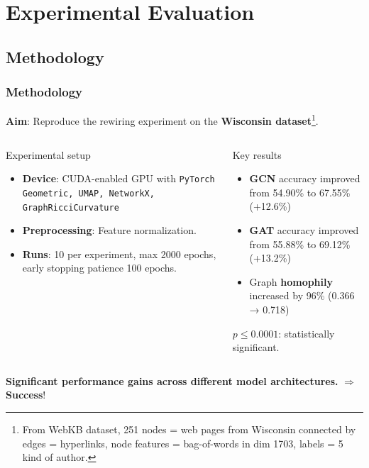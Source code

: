 \documentclass[10pt, aspectratio = 169]{beamer}
\begin{document}
\section{Experimental Evaluation}
\subsection{Methodology}
\begin{frame}
    \frametitle{Methodology}
    \textbf{Aim}: Reproduce the rewiring experiment on the \textbf{Wisconsin dataset}\footnote{
        From WebKB dataset, 251 nodes = web pages from Wisconsin connected
        by edges = hyperlinks, node features = bag-of-words in dim 1703, labels =  5 kind of author.}.

    \begin{columns}[t]
        \begin{column}{0.5\textwidth}
            \begin{block}{Experimental setup}
                \begin{itemize}
                    \item \textbf{Device}: CUDA-enabled GPU with \texttt{PyTorch Geometric, UMAP, NetworkX, GraphRicciCurvature}
                    \item \textbf{Preprocessing}: Feature normalization.
                    \item \textbf{Runs}: 10 per experiment, max 2000 epochs, early stopping patience 100 epochs.
                \end{itemize}
            \end{block}
        \end{column}    

        \begin{column}{0.5\textwidth}
            \begin{block}{Key results}
                \begin{itemize}
                        \item \textbf{GCN} accuracy improved from 54.90\% to 67.55\% (+12.6\%)
                        \item \textbf{GAT} accuracy improved from 55.88\% to 69.12\% (+13.2\%)
                        \item Graph \textbf{homophily} increased by 96\% (0.366 → 0.718)
                \end{itemize}
                $p \le 0.0001$: statistically significant.
            \end{block}


        \end{column}
    \end{columns}   
    \textbf{Significant performance gains across different model architectures.}
    $\Rightarrow$ \textbf{Success}!
        
\end{frame}
\end{document}
